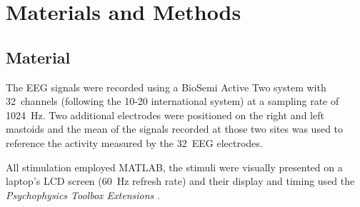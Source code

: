 \documentclass[10pt]{article}
\begin{document}
%
%




\section{Materials and Methods}
\label{sec:2MatAndMet}

    \subsection{Material}
    \label{sec:2.1Material}

    The EEG signals were recorded using a BioSemi Active Two system with 32~channels (following the 10-20 international system) at a sampling rate of \SI{1024}{\Hz}.
    Two additional electrodes were positioned on the right and left mastoids and the mean of the signals recorded at those two sites was used to reference the activity measured by the 32~EEG electrodes.

    All stimulation employed MATLAB\textsuperscript{\textregistered}, the stimuli were visually presented on a laptop's LCD screen (\SI{60}{\Hz} refresh rate) and their display and timing used the \emph{Psychophysics Toolbox Extensions} \parencite{Brainard1997,Pelli1997}.
\end{document}
